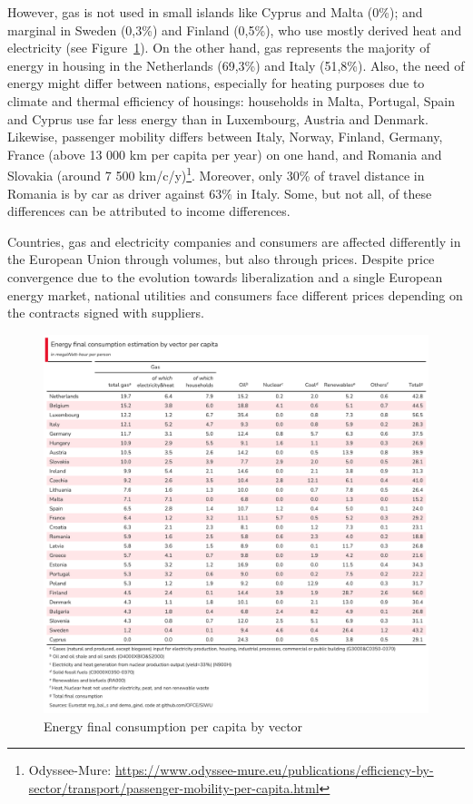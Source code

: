 \documentclass[
  9pt,
  a4paper,
  numbers=noendperiod,
  DIV=12]{scrartcl}
\begin{document}
However, gas is not used in small islands like Cyprus and Malta (0\%);
and marginal in Sweden (0,3\%) and Finland (0,5\%), who use mostly
derived heat and electricity (see Figure~\ref{fig-nrg}). On the other
hand, gas represents the majority of energy in housing in the
Netherlands (69,3\%) and Italy (51,8\%). Also, the need of energy might
differ between nations, especially for heating purposes due to climate
and thermal efficiency of housings: households in Malta, Portugal, Spain
and Cyprus use far less energy than in Luxembourg, Austria and Denmark.
Likewise, passenger mobility differs between Italy, Norway, Finland,
Germany, France (above 13 000 km per capita per year) on one hand, and
Romania and Slovakia (around 7 500 km/c/y)\footnote{Odyssee-Mure:
  \url{https://www.odyssee-mure.eu/publications/efficiency-by-sector/transport/passenger-mobility-per-capita.html}}.
Moreover, only 30\% of travel distance in Romania is by car as driver
against 63\% in Italy. Some, but not all, of these differences can be
attributed to income differences.

Countries, gas and electricity companies and consumers are affected
differently in the European Union through volumes, but also through
prices. Despite price convergence due to the evolution towards
liberalization and a single European energy market, national utilities
and consumers face different prices depending on the contracts signed
with suppliers.

\begin{figure}[htb]

\caption{\label{fig-nrg}Energy final consumption per capita by vector}

{\centering \includegraphics[width=1\textwidth,height=\textheight]{../svg/tab1.png}

}

\end{figure}
\end{document}
